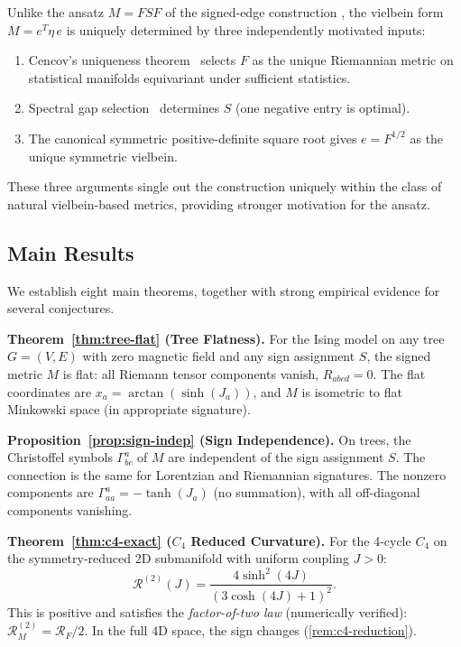 \documentclass[11pt]{article}
\theoremstyle{definition}
\theoremstyle{remark}
\newcommand{\Fish}{F}
\newcommand{\sgn}{S}
\newcommand{\Met}{M}
\newcommand{\Chr}[2]{\Gamma^{#1}_{#2}}
\newcommand{\Ric}{R}
\newcommand{\Scal}{\mathcal{R}}
\begin{document}
Unlike the ansatz $M = FSF$ of the signed-edge construction
\cite{Paper1}, the vielbein form $\Met = e^T \eta\, e$ is uniquely
determined by three independently motivated inputs:
\begin{enumerate}
\item Cencov's uniqueness theorem~\cite{Cencov1982} selects $\Fish$ as the
  unique Riemannian metric on statistical manifolds equivariant under
  sufficient statistics.
\item Spectral gap selection~\cite{Paper5} determines $\sgn$ (one negative
  entry is optimal).
\item The canonical symmetric positive-definite square root gives $e = \Fish^{1/2}$
  as the unique symmetric vielbein.
\end{enumerate}
These three arguments single out the construction uniquely within the
class of natural vielbein-based metrics, providing stronger motivation
for the ansatz.

\subsection{Main Results}
\label{subsec:main-results}

We establish eight main theorems, together with
strong empirical evidence for several conjectures.

\medskip
\noindent\textbf{Theorem~\ref{thm:tree-flat} (Tree Flatness).}
For the Ising model on any tree $G = (V, E)$ with zero magnetic field
and any sign assignment $\sgn$, the signed metric $\Met$ is flat:
all Riemann tensor components vanish, $\Ric_{abcd} = 0$.
The flat coordinates are $x_a = \arctan(\sinh(J_a))$, and $\Met$ is
isometric to flat Minkowski space (in appropriate signature).

\medskip
\noindent\textbf{Proposition~\ref{prop:sign-indep} (Sign Independence).}
On trees, the Christoffel symbols $\Chr{a}{bc}$ of $\Met$ are
independent of the sign assignment $\sgn$. The connection is the same
for Lorentzian and Riemannian signatures. The nonzero components are
$\Chr{a}{aa} = -\tanh(J_a)$ (no summation), with all off-diagonal
components vanishing.

\medskip
\noindent\textbf{Theorem~\ref{thm:c4-exact} ($C_4$ Reduced Curvature).}
For the 4-cycle $C_4$ on the symmetry-reduced 2D submanifold with uniform
coupling $J > 0$:
\begin{equation}
  \Scal^{(2)}(J) = \frac{4\sinh^2(4J)}{(3\cosh(4J)+1)^2}.
  \label{eq:c4-scalar-intro}
\end{equation}
This is positive and satisfies the \emph{factor-of-two law} (numerically verified):
$\Scal^{(2)}_{\Met} = \Scal_{\Fish}/2$. In the full 4D space, the sign changes
(\cref{rem:c4-reduction}).
\end{document}
